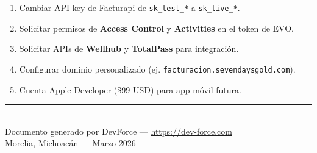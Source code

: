\documentclass[11pt,a4paper]{article}
\begin{document}
\begin{enumerate}[leftmargin=1.5cm]
  \item Cambiar API key de Facturapi de \texttt{sk\_test\_*} a \texttt{sk\_live\_*}.
  \item Solicitar permisos de \textbf{Access Control} y \textbf{Activities} en el token de EVO.
  \item Solicitar APIs de \textbf{Wellhub} y \textbf{TotalPass} para integración.
  \item Configurar dominio personalizado (ej. \texttt{facturacion.sevendaysgold.com}).
  \item Cuenta Apple Developer (\$99 USD) para app móvil futura.
\end{enumerate}

\vfill

\begin{center}
\textcolor{dfgray}{\rule{0.3\textwidth}{0.4pt}}\\[10pt]
\textcolor{dfgray}{\small Documento generado por DevForce --- \url{https://dev-force.com}}\\
\textcolor{dfgray}{\small Morelia, Michoacán --- Marzo 2026}
\end{center}
\end{document}
